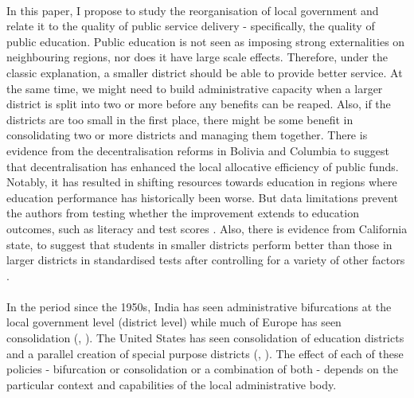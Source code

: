 \documentclass[12pt, a4paper]{article}
\begin{document}
	\paragraph{}In this paper, I propose to study the reorganisation of local government and relate it to the quality of public service delivery - specifically, the quality of public education. Public education is not seen as imposing strong externalities on neighbouring regions, nor does it have large scale effects. Therefore, under the classic explanation, a smaller district should be able to provide better service. At the same time, we might need to build administrative capacity when a larger district is split into two or more before any benefits can be reaped. Also, if the districts are too small in the first place, there might be some benefit in consolidating two or more districts and managing them together. There is evidence from the decentralisation reforms in Bolivia and Columbia to suggest that decentralisation has enhanced the local allocative efficiency of public funds. Notably, it has resulted in shifting resources towards education in regions where education performance has historically been worse. But data limitations prevent the authors from testing whether the improvement extends to education outcomes, such as literacy and test scores \parencite{faguet2008decentralization}. Also, there is evidence from California state, to suggest that students in smaller districts perform better than those in larger districts in standardised tests after controlling for a variety of other factors \parencite{driscoll2003school}.
	\paragraph{} In the period since the 1950s, India has seen administrative bifurcations at the local government level (district level) while much of Europe has seen consolidation (\cite{mouritzen_danish_2010}, \cite{bikker_scale_2016}). The United States has seen consolidation of education districts and a parallel creation of special purpose districts (\cite{strang1987administrative}, \cite{mccabe2000special}). The effect of each of these policies - bifurcation or consolidation or a combination of both - depends on the particular context and capabilities of the local administrative body. 
\end{document}
